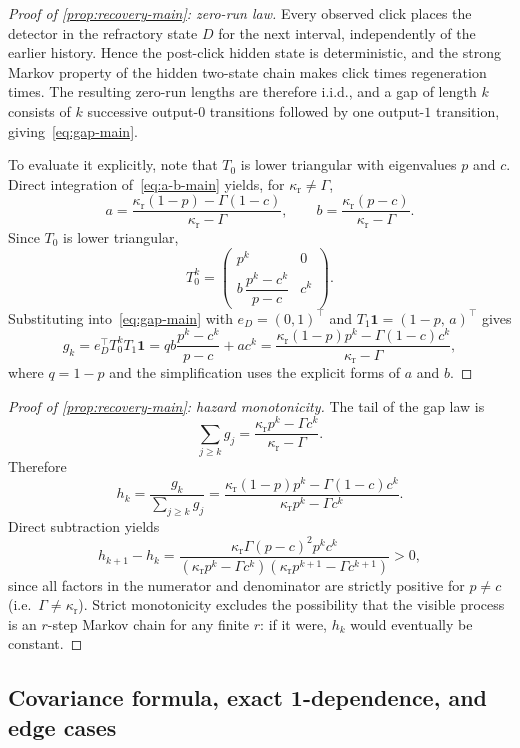 \begin{proof}[Proof of \cref{prop:recovery-main}: zero-run law]
Every observed click places the detector in the refractory state $D$ for the next interval, independently of the earlier history. Hence the post-click hidden state is deterministic, and the strong Markov property of the hidden two-state chain makes click times regeneration times. The resulting zero-run lengths are therefore i.i.d., and a gap of length $k$ consists of $k$ successive output-$0$ transitions followed by one output-$1$ transition, giving~\eqref{eq:gap-main}.

To evaluate it explicitly, note that $T_0$ is lower triangular with eigenvalues $p$ and $c$. Direct integration of~\eqref{eq:a-b-main} yields, for $\kappa_{\mathrm r}\neq\Gamma$,
\[
a=\frac{\kappa_{\mathrm r}(1-p)-\Gamma(1-c)}{\kappa_{\mathrm r}-\Gamma},
\qquad
b=\frac{\kappa_{\mathrm r}(p-c)}{\kappa_{\mathrm r}-\Gamma}.
\]
Since $T_0$ is lower triangular,
\[
T_0^k=
\begin{pmatrix}
 p^k & 0 \\
 b\,\dfrac{p^k-c^k}{p-c} & c^k
\end{pmatrix}.
\]
Substituting into~\eqref{eq:gap-main} with $e_D=(0,1)^\top$ and $T_1\mathbf{1}=(1-p,\,a)^\top$ gives
\[
g_k = e_D^\top T_0^k T_1\mathbf{1}
= qb\frac{p^k-c^k}{p-c}+ac^k
= \frac{\kappa_{\mathrm r}(1-p)p^k-\Gamma(1-c)c^k}{\kappa_{\mathrm r}-\Gamma},
\]
where $q=1-p$ and the simplification uses the explicit forms of $a$ and $b$.
\end{proof}

\begin{proof}[Proof of \cref{prop:recovery-main}: hazard monotonicity]
The tail of the gap law is
\[
\sum_{j\ge k}g_j=\frac{\kappa_{\mathrm r}p^k-\Gamma c^k}{\kappa_{\mathrm r}-\Gamma}.
\]
Therefore
\[
h_k = \frac{g_k}{\sum_{j\ge k}g_j}
= \frac{\kappa_{\mathrm r}(1-p)p^k-\Gamma(1-c)c^k}{\kappa_{\mathrm r}p^k-\Gamma c^k}.
\]
Direct subtraction yields
\[
h_{k+1}-h_k = \frac{\kappa_{\mathrm r}\Gamma(p-c)^2p^kc^k}{(\kappa_{\mathrm r}p^k-\Gamma c^k)(\kappa_{\mathrm r}p^{k+1}-\Gamma c^{k+1})} > 0,
\]
since all factors in the numerator and denominator are strictly positive for $p\neq c$ (i.e.\ $\Gamma\neq\kappa_{\mathrm r}$). Strict monotonicity excludes the possibility that the visible process is an $r$-step Markov chain for any finite $r$: if it were, $h_k$ would eventually be constant.
\end{proof}

\subsection{Covariance formula, exact 1-dependence, and edge cases}

